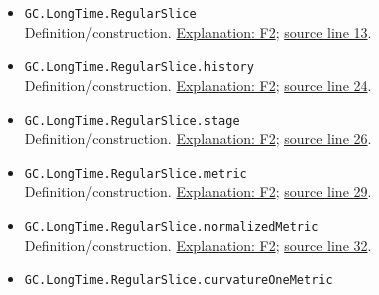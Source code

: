 \documentclass[
  letterpaper,
  11pt]{article}
\begin{document}
\begin{itemize}
\item
  {\small\texttt{GC.\allowbreak{}Long\allowbreak{}Time.\allowbreak{}Regular\allowbreak{}Slice}}\\
  Definition/construction. \hyperref[f2-slices]{Explanation: F2};
  \href{https://github.com/qinz1yang/differential-geometry-dev/blob/ea0fae60ee01ef8c8d9b57a51794c6538f679c5d/DifferentialGeometry/Geometry/Flow/RicciFlow/LongTime/RegularSlice.lean\#L13}{source
  line 13}.
\item
  {\small\texttt{GC.\allowbreak{}Long\allowbreak{}Time.\allowbreak{}Regular\allowbreak{}Slice.\allowbreak{}history}}\\
  Definition/construction. \hyperref[f2-slices]{Explanation: F2};
  \href{https://github.com/qinz1yang/differential-geometry-dev/blob/ea0fae60ee01ef8c8d9b57a51794c6538f679c5d/DifferentialGeometry/Geometry/Flow/RicciFlow/LongTime/RegularSlice.lean\#L24}{source
  line 24}.
\item
  {\small\texttt{GC.\allowbreak{}Long\allowbreak{}Time.\allowbreak{}Regular\allowbreak{}Slice.\allowbreak{}stage}}\\
  Definition/construction. \hyperref[f2-slices]{Explanation: F2};
  \href{https://github.com/qinz1yang/differential-geometry-dev/blob/ea0fae60ee01ef8c8d9b57a51794c6538f679c5d/DifferentialGeometry/Geometry/Flow/RicciFlow/LongTime/RegularSlice.lean\#L26}{source
  line 26}.
\item
  {\small\texttt{GC.\allowbreak{}Long\allowbreak{}Time.\allowbreak{}Regular\allowbreak{}Slice.\allowbreak{}metric}}\\
  Definition/construction. \hyperref[f2-slices]{Explanation: F2};
  \href{https://github.com/qinz1yang/differential-geometry-dev/blob/ea0fae60ee01ef8c8d9b57a51794c6538f679c5d/DifferentialGeometry/Geometry/Flow/RicciFlow/LongTime/RegularSlice.lean\#L29}{source
  line 29}.
\item
  {\small\texttt{GC.\allowbreak{}Long\allowbreak{}Time.\allowbreak{}Regular\allowbreak{}Slice.\allowbreak{}normalized\allowbreak{}Metric}}\\
  Definition/construction. \hyperref[f2-slices]{Explanation: F2};
  \href{https://github.com/qinz1yang/differential-geometry-dev/blob/ea0fae60ee01ef8c8d9b57a51794c6538f679c5d/DifferentialGeometry/Geometry/Flow/RicciFlow/LongTime/RegularSlice.lean\#L32}{source
  line 32}.
\item
  {\small\texttt{GC.\allowbreak{}Long\allowbreak{}Time.\allowbreak{}Regular\allowbreak{}Slice.\allowbreak{}curvature\allowbreak{}One\allowbreak{}Metric}}\\

\end{itemize}
\end{document}
